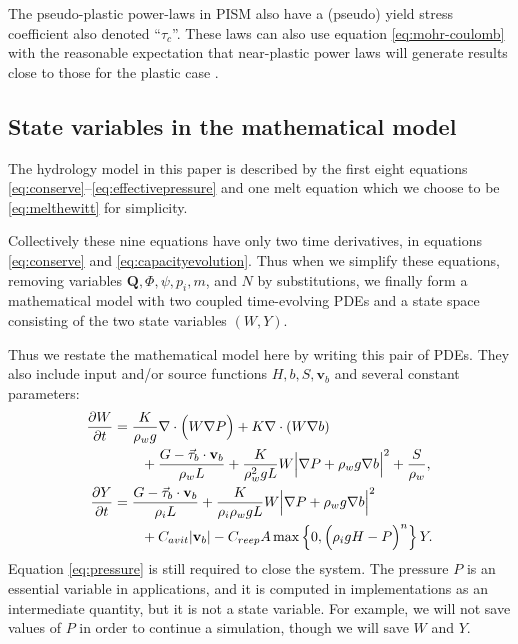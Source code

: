 \documentclass[11pt]{amsart}
\newcommand{\bQ}{\mathbf{Q}}
\newcommand{\bv}{\mathbf{v}}
\newcommand{\Cavit}{C_{avit}}
\newcommand{\Creep}{C_{reep}}
\begin{document}
The pseudo-plastic power-laws in PISM \citep{pism-user-manual} also have a (pseudo) yield stress coefficient also denoted ``$\tau_c$''.  These laws can also use equation \eqref{eq:mohr-coulomb} with the reasonable expectation that near-plastic power laws will generate results close to those for the plastic case \citep{SchoofCoulombBlatter}.


\subsection*{State variables in the mathematical model}  The hydrology model in this paper is described by the first eight equations \eqref{eq:conserve}--\eqref{eq:effectivepressure} and one melt equation which we choose to be \eqref{eq:melthewitt} for simplicity.

Collectively these nine equations have only two time derivatives, in equations \eqref{eq:conserve} and \eqref{eq:capacityevolution}.  Thus when we simplify these equations, removing variables $\bQ,\Phi,\psi,p_i,m$, and $N$ by substitutions, we finally form a mathematical model with two coupled time-evolving PDEs and a state space consisting of the two state variables $(W,Y)$.

Thus we restate the mathematical model here by writing this pair of PDEs.  They also include input and/or source functions $H,b,S,\bv_b$ and several constant parameters:
\begin{align}
\frac{\partial W}{\partial t} &= \frac{K}{\rho_w g} \nabla \cdot \Big(W \nabla P\Big) + K \nabla \cdot \left(W \nabla b\right) \label{eq:nonlineardiffusion} \\
  &\qquad + \frac{G - \vec \tau_b\cdot \bv_b}{\rho_w L} + \frac{K}{\rho_w^2 g L} W \Big|\nabla P + \rho_w g \nabla b\Big|^2 + \frac{S}{\rho_w},  \notag \\
\frac{\partial Y}{\partial t} &= \frac{G - \vec \tau_b\cdot \bv_b}{\rho_i L} + \frac{K}{\rho_i \rho_w g L} W \Big|\nabla P + \rho_w g \nabla b\Big|^2 \label{eq:coupledcap} \\
  &\qquad + \Cavit |\bv_b| - \Creep A  \max\left\{0,\Big(\rho_i g H - P\Big)^n\right\} Y.  \notag
\end{align}
Equation \eqref{eq:pressure} is still required to close the system.  The pressure $P$ is an essential variable in applications, and it is computed in implementations as an intermediate quantity, but it is not a state variable.  For example, we will not save values of $P$ in order to continue a simulation, though we will save $W$ and $Y$.
	
\end{document}
